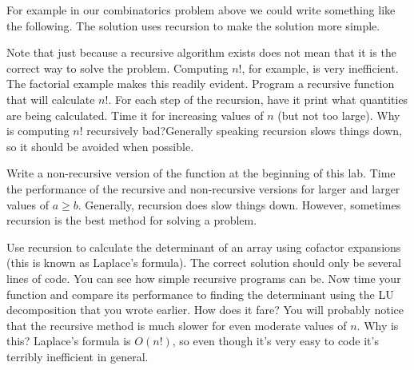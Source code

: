 For example in our combinatorics problem above we could write something like the following.  The solution uses recursion to make the solution more simple.



\begin{problem}
Note that just because a recursive algorithm exists does not mean that it is the correct way to solve the problem. Computing $n!$, for example, is very inefficient.   The factorial example makes this readily evident. Program a recursive function that will calculate $n!$.  For each step of the recursion, have it print what quantities are being calculated. Time it for increasing values of $n$ (but not too large).  Why is computing $n!$ recursively bad?Generally speaking recursion slows things down, so it should be avoided when possible.
\end{problem}

\begin{problem}
Write a non-recursive version of the  function at the beginning of this lab.  Time the performance of the recursive and non-recursive versions for larger and larger values of $a \geq b$. Generally, recursion does slow things down.  However, sometimes recursion is the best method for solving a problem.
\end{problem}


\begin{problem}
Use recursion to calculate the determinant of an array using cofactor expansions (this is known as Laplace's formula). The correct solution should only be several lines of code. You can see how simple recursive programs can be. Now time your function and compare its performance to finding the determinant using the LU decomposition that you wrote earlier. How does it fare? You will probably notice that the recursive method is much slower for even moderate values of $n$. Why is this? Laplace's formula is $O(n!)$, so even though it's very easy to code it's terribly inefficient in general.
\end{problem}